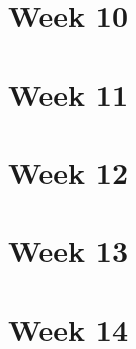 \documentclass[a4paper]{book}
\begin{document}
\chapter{Week 10}



\chapter{Week 11}



\chapter{Week 12}



\chapter{Week 13}



\chapter{Week 14}
\end{document}
